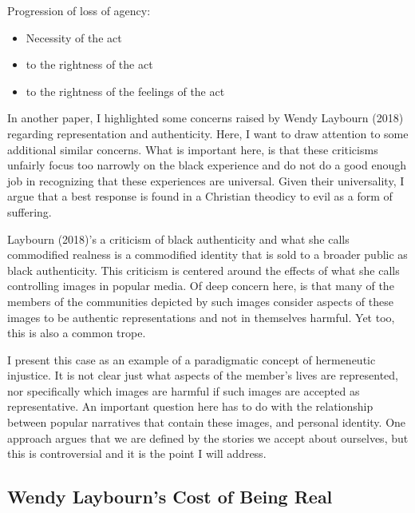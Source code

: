 \documentclass[
  letterpaper,
  DIV=11,
  numbers=noendperiod]{scrreprt}
\providecommand{\tightlist}{%
  \setlength{\itemsep}{0pt}\setlength{\parskip}{0pt}}\usepackage{longtable,booktabs,array}
\begin{document}
\begin{tcolorbox}[enhanced jigsaw, arc=.35mm, breakable, rightrule=.15mm, colback=white, colframe=quarto-callout-important-color-frame, bottomrule=.15mm, leftrule=.75mm, opacityback=0, toprule=.15mm, left=2mm]
\begin{tcolorbox}[enhanced jigsaw, arc=.35mm, breakable, rightrule=.15mm, colback=white, colframe=quarto-callout-tip-color-frame, bottomrule=.15mm, leftrule=.75mm, opacityback=0, toprule=.15mm, left=2mm]
Progression of loss of agency:

\begin{itemize}
\tightlist
\item
  Necessity of the act
\item
  to the rightness of the act
\item
  to the rightness of the feelings of the act
\end{itemize}

In another paper, I highlighted some concerns raised by Wendy Laybourn
(2018) regarding representation and authenticity. Here, I want to draw
attention to some additional similar concerns. What is important here,
is that these criticisms unfairly focus too narrowly on the black
experience and do not do a good enough job in recognizing that these
experiences are universal. Given their universality, I argue that a best
response is found in a Christian theodicy to evil as a form of
suffering.

Laybourn (2018)'s a criticism of black authenticity and what she calls
commodified realness is a commodified identity that is sold to a broader
public as black authenticity. This criticism is centered around the
effects of what she calls controlling images in popular media. Of deep
concern here, is that many of the members of the communities depicted by
such images consider aspects of these images to be authentic
representations and not in themselves harmful. Yet too, this is also a
common trope.

I present this case as an example of a paradigmatic concept of
hermeneutic injustice. It is not clear just what aspects of the member's
lives are represented, nor specifically which images are harmful if such
images are accepted as representative. An important question here has to
do with the relationship between popular narratives that contain these
images, and personal identity. One approach argues that we are defined
by the stories we accept about ourselves, but this is controversial and
it is the point I will address.

\subsection{Wendy Laybourn's Cost of Being
Real}\label{wendy-laybourns-cost-of-being-real}


\end{tcolorbox}
\end{tcolorbox}
\end{document}
